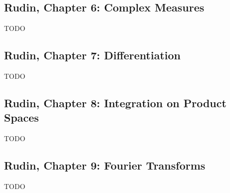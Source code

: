 \subsection{Rudin, Chapter 6: Complex Measures}

TODO

\subsection{Rudin, Chapter 7: Differentiation}

TODO

\subsection{Rudin, Chapter 8: Integration on Product Spaces}

TODO

\subsection{Rudin, Chapter 9: Fourier Transforms}

TODO

